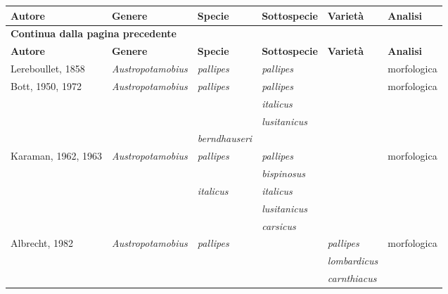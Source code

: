 \documentclass[11pt,a4paper,italian,twoside,openany]{memoir}
\begin{document}
\small
\begin{longtable}[c]{@{}llllll@{}}
\toprule
\textbf{Autore}        & \textbf{Genere}           & \textbf{Specie}       & \textbf{Sottospecie}  & \textbf{Varietà} & \textbf{Analisi}          \\* \midrule
\endfirsthead
\multicolumn{6}{l}{\footnotesize\bfseries Continua dalla pagina precedente} \\
\textbf{Autore}        & \textbf{Genere}           & \textbf{Specie}       & \textbf{Sottospecie}  & \textbf{Varietà} & \textbf{Analisi}          \\* \midrule
\endhead
%
\bottomrule
\endfoot
%
\endlastfoot
%
\rowcolor[HTML]{EFEFEF} 
Lereboullet, 1858      & \textit{Austropotamobius} & \textit{pallipes}     & \textit{pallipes}     &       & morfologica    \\
Bott, 1950, 1972       & \textit{Austropotamobius} & \textit{pallipes}     & \textit{pallipes}     &       & morfologica    \\
            & \textit{}      & \textit{}  & \textit{italicus}     &       &     \\
            & \textit{}      & \textit{}  & \textit{lusitanicus}  &       &     \\
            & \textit{}      & \textit{berndhauseri} & \textit{}  &       &     \\
\rowcolor[HTML]{EFEFEF} 
Karaman, 1962, 1963    & \textit{Austropotamobius} & \textit{pallipes}     & \textit{pallipes}     &       & morfologica    \\
\rowcolor[HTML]{EFEFEF} 
            & \textit{}      & \textit{}  & \textit{bispinosus}   &       &     \\
\rowcolor[HTML]{EFEFEF} 
            & \textit{}      & \textit{italicus}     & \textit{italicus}     &       &     \\
\rowcolor[HTML]{EFEFEF} 
            & \textit{}      & \textit{}  & \textit{lusitanicus}  &       &     \\
\rowcolor[HTML]{EFEFEF} 
            & \textit{}      & \textit{}  & \textit{carsicus}     &       &     \\
Albrecht, 1982         & \textit{Austropotamobius}          & \textit{pallipes}   &            & \textit{pallipes}         & morfologica    \\
            &     &            &            & \textit{lombardicus}      &     \\
            &     &            &            & \textit{carnthiacus}      &     \\

\end{longtable}
\end{document}
